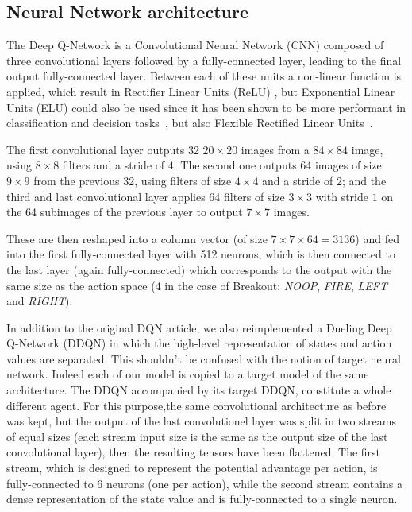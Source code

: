 \documentclass[letterpaper]{article}
\begin{document}
\subsection{Neural Network architecture}

The Deep Q-Network is a Convolutional Neural Network (CNN) composed of three convolutional layers followed by a fully-connected layer,
leading to the final output fully-connected layer.
Between each of these units a non-linear function is applied, which result in Rectifier Linear Units (ReLU) \citep{krizhevsky2012imagenet}, but Exponential Linear Units (ELU) could
also be used since it has been shown to be more performant in classification and decision tasks~\citep{DBLP:journals/corr/ClevertUH15}, but also
Flexible Rectified Linear Units~\citep{qiu2017flexible}.

The first convolutional layer outputs 32 $20 \times 20$ images from a $84 \times 84$ image, using $8 \times 8$ filters and a stride of $4$. The second one outputs
64 images of size $9 \times 9$ from the previous 32, using filters of size $4 \times 4$ and a stride of $2$; and the third and last convolutional layer
applies 64 filters of size $3 \times 3$ with stride $1$ on the 64 subimages of the previous layer to output $7 \times 7$ images.

These are then reshaped into a column vector (of size $7 \times 7 \times 64 = 3136$) and fed into the first fully-connected layer with 512 neurons,
which is then connected to the last layer (again fully-connected) which corresponds to the output with the same size as the action space (4 in the
case of Breakout: \textit{NOOP}, \textit{FIRE}, \textit{LEFT} and \textit{RIGHT}).

In addition to the original DQN article, we also reimplemented a Dueling Deep Q-Network \citep{DBLP} (DDQN) in which the high-level representation of states
and action values are separated. This shouldn't be confused with the notion of target neural network. Indeed each of our model is copied to a target model
of the same architecture. The DDQN accompanied by its target DDQN, constitute a whole different agent.
For this purpose,the same convolutional architecture as before was kept, but the output of the last convolutionel layer was split in two streams of
equal sizes (each stream input size is the same as the output size of the last convolutional layer), then the resulting tensors have been flattened.
The first stream, which is designed to represent the potential advantage per action, is fully-connected to 6 neurons (one per action), while the second stream
contains a dense representation of the state value and is fully-connected to a single neuron.
\end{document}
